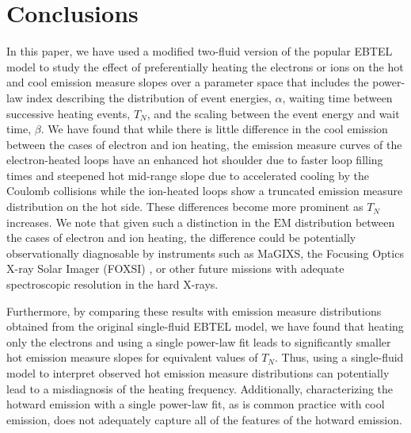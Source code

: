 \documentclass[apj]{emulateapj}
\begin{document}
	\section{Conclusions}
	\label{sec:conclusions}
	\par In this paper, we have used a modified two-fluid version of the popular EBTEL model to study the effect of preferentially heating the electrons or ions on the hot and cool emission measure slopes over a parameter space that includes the power-law index describing the distribution of event energies, $\alpha$, waiting time between successive heating events, $T_N$, and the scaling between the event energy and wait time, $\beta$. We have found that while there is little difference in the cool emission between the cases of electron and ion heating, the emission measure curves of the electron-heated loops have an enhanced hot shoulder due to faster loop filling times and steepened hot mid-range slope due to accelerated cooling by the Coulomb collisions while the ion-heated loops show a truncated emission measure distribution on the hot side. These differences become more prominent as $T_N$ increases. We note that given such a distinction in the $\mathrm{EM}$ distribution between the cases of electron and ion heating, the difference could be potentially observationally diagnosable by instruments such as MaGIXS, the Focusing Optics X-ray Solar Imager (FOXSI) \citep{krucker_focusing_2011}, or other future missions with adequate spectroscopic resolution in the hard X-rays.
	\par Furthermore, by comparing these results with emission measure distributions obtained from the original single-fluid EBTEL model, we have found that heating only the electrons and using a single power-law fit leads to significantly smaller hot emission measure slopes for equivalent values of $T_N$. Thus, using a single-fluid model to interpret observed hot emission measure distributions can potentially lead to a misdiagnosis of the heating frequency. Additionally, characterizing the hotward emission with a single power-law fit, as is common practice with cool emission, does not adequately capture all of the features of the hotward emission.
\end{document}
